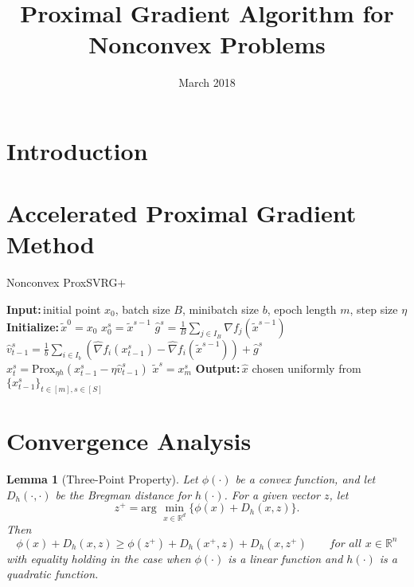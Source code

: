\documentclass{article}
\title{Proximal Gradient Algorithm for Nonconvex Problems}
\date{March 2018}
\newcommand*{\R}{\mathbb{R}}
\newcommand*{\Po}{\text{Prox}}
\newcommand{\Initialize}{\textbf{Initialize:}{\,}}
\newcommand{\Input}{\textbf{Input:}{\,}}
\newcommand{\Output}{\textbf{Output:}{\,}}
\newtheorem{lemma}[theorem]{Lemma}
\theoremstyle{definition}
\theoremstyle{remark}
\begin{document}
\maketitle

\section{Introduction}


\section{Accelerated Proximal Gradient Method}


\begin{algorithm}\label{APGnonconvex-Algo}
\caption{Nonconvex ProxSVRG+}
\begin{algorithmic}[1]
\State\Input initial point $x_0$, batch size $B$, minibatch size $b$, epoch length $m$, step size $\eta$
\State\Initialize $\tilde{x}^0 = x_0$
\State $x_0^s = \widetilde{x}^{s-1}$
\State $\hat{g}^s = \frac{1}{B} \sum_{j\in I_B} \nabla f_j (\widetilde{x}^{s-1})$
\State ${\hat{v}}_{t-1}^s = \frac{1}{b} \sum_{i\in I_b}\left(\hat{\nabla} f_{i}(x_{t-1}^s)-\hat{\nabla} f_{i}(\tilde{x}^{s-1})\right)+\hat{g}^s$
\State $x_{t}^s= \Po_{\eta h}(x_{t-1}^s - \eta \hat{v}_{t-1}^s)$
\EndFor
\State $\widetilde{x}^{s} = x_m^s$
 \EndFor
 \State\Output $\hat{x}$ chosen uniformly from $\{x_{t-1}^s\}_{t\in [m], s\in [S]}$
\end{algorithmic}
\end{algorithm}

\section{Convergence Analysis}
\begin{lemma}[Three-Point Property] Let $\phi(\cdot)$ be a convex function, and let $D_{h}(\cdot,\cdot)$ be the Bregman distance for $h(\cdot)$. For a given vector $z$, let 
\[
z^+ = \text{arg}\,\,\min_{x\in\R^d}\{\phi(x)+D_{h}(x,z)\}.
\]
Then 
\begin{equation}
\phi(x) + D_h(x,z) \geq \phi(z^+) + D_h(x^+,z) + D_h(x,z^+)\qquad for\,\,all\,\,x\in\R^n
\end{equation}
with equality holding in the case when $\phi(\cdot)$ is a linear function and $h(\cdot)$ is a quadratic function.
\end{lemma}
\end{document}
